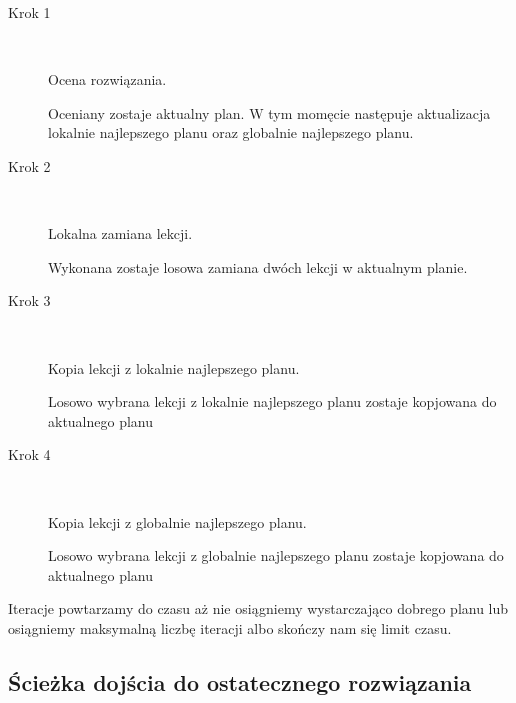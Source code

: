 \begin{description}
  \item[Krok 1] \hfill \\
     \par Ocena rozwiązania. \hfill \\
   \par Oceniany zostaje aktualny plan. W tym momęcie następuje aktualizacja lokalnie najlepszego planu oraz globalnie najlepszego planu.
  \item[Krok 2] \hfill \\
     \par Lokalna zamiana lekcji. \hfill \\
    \par Wykonana zostaje losowa zamiana dwóch lekcji w aktualnym planie.

  \item[Krok 3] \hfill \\
      \par Kopia lekcji z lokalnie najlepszego planu. \hfill \\
        \par Losowo wybrana lekcji z lokalnie najlepszego planu zostaje kopjowana do aktualnego planu 
  \item[Krok 4] \hfill \\
      \par Kopia lekcji z globalnie najlepszego planu. \hfill \\
        \par Losowo wybrana lekcji z globalnie najlepszego planu zostaje kopjowana do aktualnego planu 
\end{description}
\par Iteracje powtarzamy do czasu aż nie osiągniemy wystarczająco dobrego planu lub osiągniemy maksymalną liczbę iteracji albo skończy nam się limit czasu.
\subsection{Ścieżka dojścia do ostatecznego rozwiązania}
